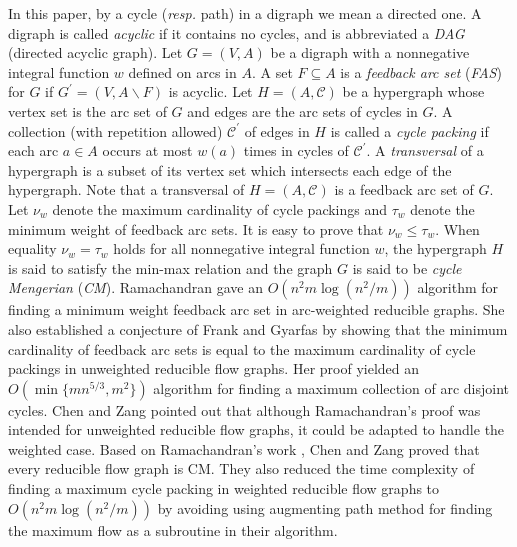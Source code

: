 \documentclass[11pt]{article}
\begin{document}
In this paper, by a cycle (\emph{resp.} path) in a digraph we mean a directed one. A digraph is called \emph{acyclic} if it contains no cycles, and is abbreviated a \emph{DAG} (directed acyclic graph). Let $G=(V,A)$ be a digraph with a nonnegative integral function $w$ defined on arcs in $A$. A set $F\subseteq A$ is a \emph{feedback arc set} (\emph{FAS}) for $G$ if $G^\prime=(V,A\backslash F)$ is acyclic. Let $H=(A,\mathcal{C})$ be a hypergraph whose vertex set is the arc set of $G$ and edges are the arc sets of cycles in $G$. A collection (with repetition allowed) $\mathcal{C}^\prime$ of edges in $H$ is called a \emph{cycle packing} if each arc $a\in A$ occurs at most $w(a)$ times in cycles of $\mathcal{C}^\prime$. A \emph{transversal} of a hypergraph is a subset of its vertex set which intersects each edge of the hypergraph. Note that a transversal of $H=(A,\mathcal{C})$ is a feedback arc set of $G$. Let $\nu_w$ denote the maximum cardinality of cycle packings and $\tau_w$ denote the minimum weight of feedback arc sets. It is easy to prove that $\nu_w\leq\tau_w$. When equality $\nu_w=\tau_w$ holds for all nonnegative integral function $w$, the hypergraph $H$ is said to satisfy the min-max relation and the graph $G$ is said to be \emph{cycle Mengerian} (\emph{CM}). Ramachandran \cite{Rama1} gave an $O(n^2m\log(n^2 / m))$ algorithm for finding a minimum weight feedback arc set in arc-weighted reducible graphs. She \cite{Rama2} also established a conjecture of Frank and Gyarfas \cite{FraG} by showing that the minimum cardinality of feedback arc sets is equal to the maximum cardinality of cycle packings  in unweighted reducible flow graphs. Her proof yielded an $O(\min\{mn^{5/3},m^2\})$ algorithm for finding a maximum collection of arc disjoint cycles. Chen and Zang \cite{CheZ} pointed out that although Ramachandran's proof \cite{Rama2} was intended for unweighted reducible flow graphs, it could be adapted to handle the weighted case. Based on Ramachandran's work \cite{Rama1,Rama2}, Chen and Zang \cite{CheZ} proved that every reducible flow graph is CM. They also reduced the time complexity of finding a maximum cycle packing in weighted reducible flow graphs to $O(n^2 m\log(n^2/m))$  by avoiding using augmenting path method for finding the maximum flow as a subroutine in their algorithm. 
\end{document}
